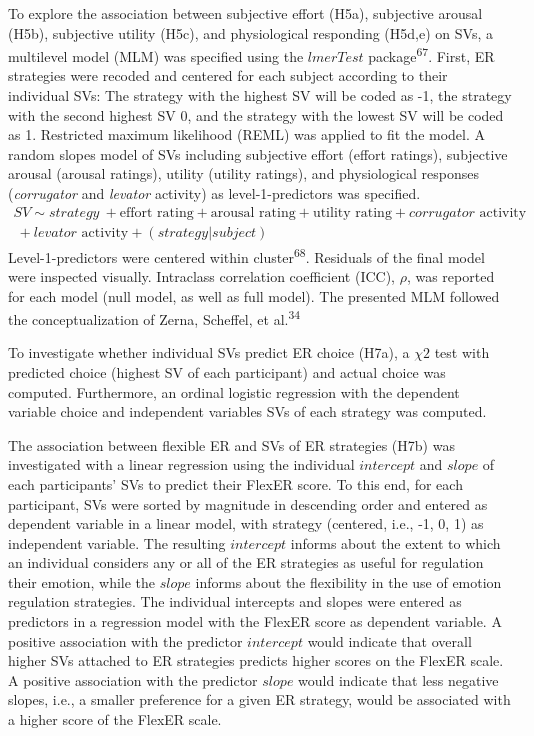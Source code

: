 \documentclass[
  man,floatsintext]{apa6}
\begin{document}
To explore the association between subjective effort (H5a), subjective arousal (H5b), subjective utility (H5c), and physiological responding (H5d,e) on SVs, a multilevel model (MLM) was specified using the \(lmerTest\) package\textsuperscript{67}.
First, ER strategies were recoded and centered for each subject according to their individual SVs: The strategy with the highest SV will be coded as -1, the strategy with the second highest SV 0, and the strategy with the lowest SV will be coded as 1.
Restricted maximum likelihood (REML) was applied to fit the model.
A random slopes model of SVs including subjective effort (effort ratings), subjective arousal (arousal ratings), utility (utility ratings), and physiological responses (\emph{corrugator} and \emph{levator} activity) as level-1-predictors was specified.
\[
\begin{split}
SV \sim strategy\ + \text{effort rating} + \text{arousal rating} + \text{utility rating} + corrugator \text{ activity} \\\ + levator \text{ activity} + (strategy|subject)
\end{split}
\]
Level-1-predictors were centered within cluster\textsuperscript{68}.
Residuals of the final model were inspected visually.
Intraclass correlation coefficient (ICC), \(\rho\), was reported for each model (null model, as well as full model).
The presented MLM followed the conceptualization of Zerna, Scheffel, et al.\textsuperscript{34}

To investigate whether individual SVs predict ER choice (H7a), a \(\chi{2}\) test with predicted choice (highest SV of each participant) and actual choice was computed.
Furthermore, an ordinal logistic regression with the dependent variable choice and independent variables SVs of each strategy was computed.

The association between flexible ER and SVs of ER strategies (H7b) was investigated with a linear regression using the individual \(intercept\) and \(slope\) of each participants' SVs to predict their FlexER score.
To this end, for each participant, SVs were sorted by magnitude in descending order and entered as dependent variable in a linear model, with strategy (centered, i.e., -1, 0, 1) as independent variable.
The resulting \(intercept\) informs about the extent to which an individual considers any or all of the ER strategies as useful for regulation their emotion, while the \(slope\) informs about the flexibility in the use of emotion regulation strategies.
The individual intercepts and slopes were entered as predictors in a regression model with the FlexER score as dependent variable.
A positive association with the predictor \(intercept\) would indicate that overall higher SVs attached to ER strategies predicts higher scores on the FlexER scale.
A positive association with the predictor \(slope\) would indicate that less negative slopes, i.e., a smaller preference for a given ER strategy, would be associated with a higher score of the FlexER scale.
\end{document}
